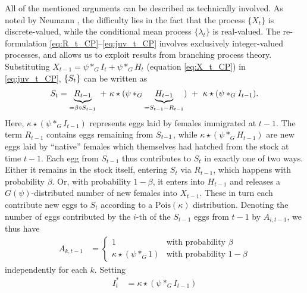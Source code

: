 \documentclass[review]{elsarticle}
\begin{document}
All of the mentioned arguments can be described as technically involved. As noted by Neumann \cite{Neumann2011}, the difficulty lies in the fact that the process $\{X_t\}$ is discrete-valued, while the conditional mean process $\{\lambda_t\}$ is real-valued. The re-formulation \eqref{eq:R_t_CP}--\eqref{eq:juv_t_CP} involves exclusively integer-valued processes, and allows us to exploit results from branching process theory. Substituting $X_{t - 1} = \psi *_G I_t + \psi *_G H_t$ (equation \eqref{eq:X_t_CP}) in \eqref{eq:juv_t_CP}, $\{S_t\}$ can be written as
\begin{align}
S_t = \underbrace{R_{t - 1}}_{= \beta \circ S_{t - 1}} \ + \ \kappa \star (\psi *_G \underbrace{H_{t - 1}}_{ = S_{t - 1} - R_{t - 1}}) \ + \ \kappa \star (\psi *_G I_{t - 1}). \label{eq:recursion_S}
\end{align}
Here, $\kappa \star (\psi *_G I_{t - 1})$ represents eggs laid by females immigrated at $t - 1$. The term  $R_{t - 1}$ contains eggs remaining from $ S_{t - 1}$, while $\kappa \star (\psi *_G H_{t - 1})$ are new eggs laid by ``native'' females which themselves had hatched from the stock at time $t - 1$. Each egg from $S_{t - 1}$ thus contributes to $S_t$ in exactly one of two ways. Either it remains in the stock itself, entering $S_t$ via $R_{t - 1}$, which happens with probability $\beta$. Or, with probability $1 - \beta$, it enters into $H_{t - 1}$ and releases a $G(\psi)$-distributed number of new females into $X_{t - 1}$. These in turn each contribute new eggs to $S_t$ according to a $\text{Pois}(\kappa)$ distribution. Denoting the number of eggs contributed by the $i$-th of the $S_{t - 1}$ eggs from $t - 1$ by $A_{i, t - 1}$, we thus have
\begin{align}
A_{k, t - 1} & = \begin{cases}
1 & \text{with probability } \beta\\ %
\kappa \star (\psi *_G 1) & \text{with probability } 1 - \beta %
\label{eq:Z_t_i}
\end{cases}
\end{align}
independently for each $k$. Setting
\begin{align}
I^*_t & = \kappa\star (\psi *_G I_{t - 1}) \label{eq:I_star}
\end{align}
\end{document}
